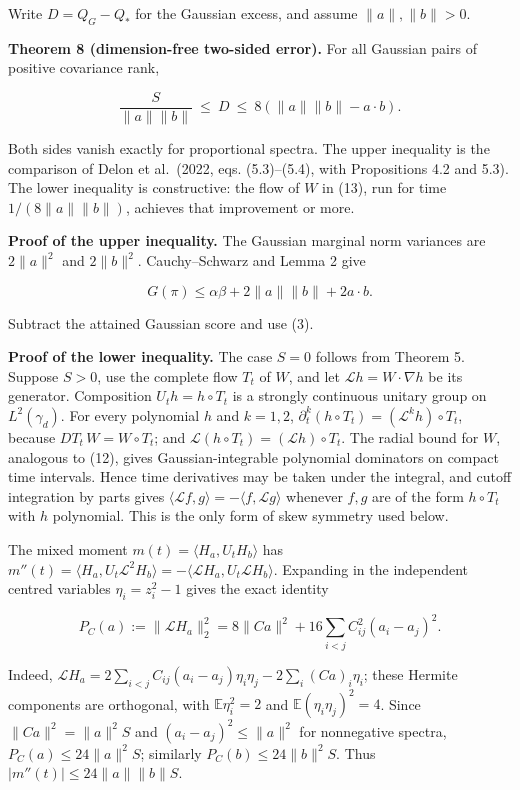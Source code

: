 \documentclass[
  british,
  11pt,
  a4paper,
]{article}
\begin{document}
Write \(D=Q_G-Q_*\) for the Gaussian excess, and assume
\(\|a\|,\|b\|>0\).

\textbf{Theorem 8 (dimension-free two-sided error).} For all Gaussian
pairs of positive covariance rank,

\[
\boxed{\quad
\frac{S}{\|a\|\|b\|}\ \leq\ D\ \leq\ 8(\|a\|\|b\|-a\cdot b).
\quad}                                                        \tag{15}
\]

Both sides vanish exactly for proportional spectra. The upper inequality
is the comparison of Delon et al.~(2022, eqs. (5.3)--(5.4), with
Propositions 4.2 and 5.3). The lower inequality is constructive: the
flow of \(W\) in (13), run for time \(1/(8\|a\|\|b\|)\), achieves that
improvement or more.

\textbf{Proof of the upper inequality.} The Gaussian marginal norm
variances are \(2\|a\|^2\) and \(2\|b\|^2\). Cauchy--Schwarz and Lemma 2
give

\[
G(\pi)\leq\alpha\beta+2\|a\|\|b\|+2a\cdot b.
\]

Subtract the attained Gaussian score and use (3).

\textbf{Proof of the lower inequality.} The case \(S=0\) follows from
Theorem 5. Suppose \(S>0\), use the complete flow \(T_t\) of \(W\), and
let \(\mathcal Lh=W\cdot\nabla h\) be its generator. Composition
\(U_th=h\circ T_t\) is a strongly continuous unitary group on
\(L^2(\gamma_d)\). For every polynomial \(h\) and \(k=1,2\),
\(\partial_t^k(h\circ T_t)=(\mathcal L^kh)\circ T_t\), because
\(DT_t\,W=W\circ T_t\); and
\(\mathcal L(h\circ T_t)=(\mathcal Lh)\circ T_t\). The radial bound for
\(W\), analogous to (12), gives Gaussian-integrable polynomial
dominators on compact time intervals. Hence time derivatives may be
taken under the integral, and cutoff integration by parts gives
\(\langle\mathcal Lf,g\rangle=-\langle f,\mathcal Lg\rangle\) whenever
\(f,g\) are of the form \(h\circ T_t\) with \(h\) polynomial. This is
the only form of skew symmetry used below.

The mixed moment \(m(t)=\langle H_a,U_tH_b\rangle\) has
\(m''(t)=\langle H_a,U_t\mathcal L^2H_b\rangle=-\langle \mathcal LH_a,U_t\mathcal LH_b\rangle\).
Expanding in the independent centred variables \(\eta_i=z_i^2-1\) gives
the exact identity

\[
P_C(a):=\|\mathcal LH_a\|_2^2
=8\|Ca\|^2+16\sum_{i<j}C_{ij}^2(a_i-a_j)^2.                    \tag{16}
\]

Indeed, \(\mathcal LH_a=2\sum_{i<j}C_{ij}(a_i-a_j)\eta_i\eta_j
-2\sum_i(Ca)_i\eta_i\); these Hermite components are orthogonal, with
\(\mathbb E\eta_i^2=2\) and \(\mathbb E(\eta_i\eta_j)^2=4\). Since
\(\|Ca\|^2=\|a\|^2S\) and \((a_i-a_j)^2\leq\|a\|^2\) for nonnegative
spectra, \(P_C(a)\leq24\|a\|^2S\); similarly \(P_C(b)\leq24\|b\|^2S\).
Thus \(|m''(t)|\leq24\|a\|\|b\|S\).
\end{document}
